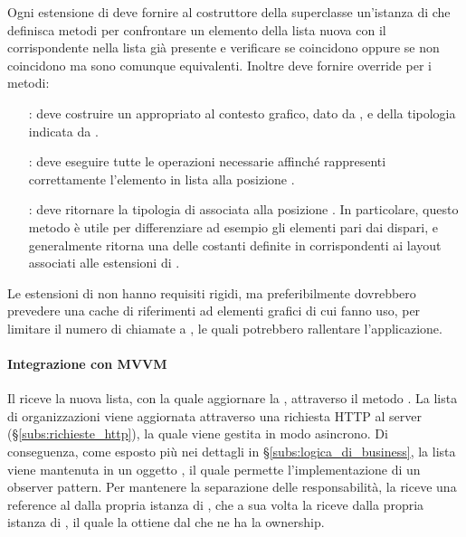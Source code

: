 \documentclass[../../manuale-sviluppatore.tex]{subfiles}
\begin{document}
Ogni estensione di  deve fornire al costruttore della superclasse un'istanza di  che definisca metodi per confrontare un elemento della lista nuova con il corrispondente nella lista già presente e verificare se coincidono oppure se non coincidono ma sono comunque equivalenti. Inoltre deve fornire override per i metodi:
\begin{itemize}
  \item[\java{public OrgViewHolder onCreateViewHolder(ViewGroup parent, int viewType)}:] deve costruire un  appropriato al contesto grafico, dato da , e della tipologia indicata da .
  \item[\java{public void onBindViewHolder(OrgViewHolder holder, int position)}:] deve eseguire tutte le operazioni necessarie affinché  rappresenti correttamente l'elemento in lista alla posizione .
  \item[\java{public int getItemViewType(int position)}:] deve ritornare la tipologia di  associata alla posizione  . In particolare, questo metodo è utile per differenziare ad esempio gli elementi pari dai dispari, e generalmente ritorna una delle costanti definite in  corrispondenti ai layout associati alle estensioni di .
\end{itemize}

Le estensioni di  non hanno requisiti rigidi, ma preferibilmente dovrebbero prevedere una cache di riferimenti ad elementi grafici di cui fanno uso, per limitare il numero di chiamate a , le quali potrebbero rallentare l'applicazione.

\paragraph{Integrazione con MVVM}%
\label{par:integrazione_con_mvvm}
Il  riceve la nuova lista, con la quale aggiornare la , attraverso il metodo .
La lista di organizzazioni viene aggiornata attraverso una richiesta HTTP al server (§\ref{subs:richieste_http}), la quale viene gestita in modo asincrono.
Di conseguenza, come esposto più nei dettagli in §\ref{subs:logica_di_business}, la lista viene mantenuta in un oggetto , il quale permette l'implementazione di un observer pattern.
Per mantenere la separazione delle responsabilità, la  riceve una reference al  dalla propria istanza di , che a sua volta la riceve dalla propria istanza di , il quale la ottiene dal  che ne ha la ownership.
\end{document}
